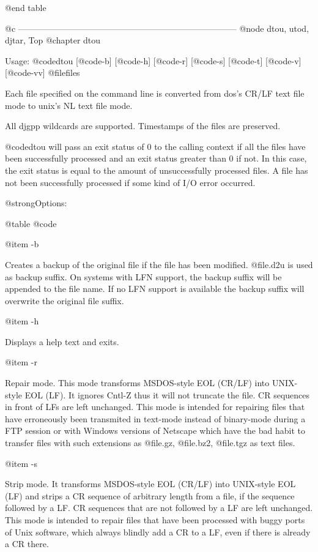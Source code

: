 @end table

@c -----------------------------------------------------------------------------
@node dtou, utod, djtar, Top
@chapter dtou

Usage: @code{dtou} [@code{-b}] [@code{-h}] [@code{-r}] [@code{-s}] [@code{-t}]
[@code{-v}] [@code{-vv}] @file{files}

Each file specified on the command line is converted from dos's CR/LF
text file mode to unix's NL text file mode.

All djgpp wildcards are supported.  Timestamps of the files are preserved.

@code{dtou} will pass an exit status of 0 to the calling context if all the
files have been successfully processed and an exit status greater than 0 if
not.  In this case, the exit status is equal to the amount of unsuccessfully
processed files.  A file has not been successfully processed if some kind of
I/O error occurred.

@strong{Options:}

@table @code

@item -b

Creates a backup of the original file if the file has been modified.
@file{.d2u} is used as backup suffix.  On systems with LFN support, the
backup suffix will be appended to the file name.  If no LFN support is
available the backup suffix will overwrite the original file suffix.

@item -h

Displays a help text and exits.

@item -r

Repair mode.  This mode transforms MSDOS-style EOL (CR/LF) into
UNIX-style EOL (LF).  It ignores Cntl-Z thus it will not truncate the file.
CR sequences in front of LFs are left unchanged.  This mode is intended
for repairing files that have erroneously been transmited in text-mode
instead of binary-mode during a FTP session or with Windows versions of
Netscape which have the bad habit to transfer files with such extensions
as @file{.gz}, @file{.bz2}, @file{.tgz} as text files.

@item -s

Strip mode.  It transforms MSDOS-style EOL (CR/LF) into UNIX-style EOL (LF)
and strips a CR sequence of arbitrary length from a file, if the sequence
followed by a LF.  CR sequences that are not followed by a LF are left
unchanged.  This mode is intended to repair files that have been processed
with buggy ports of Unix software, which always blindly add a CR to a LF,
even if there is already a CR there.

